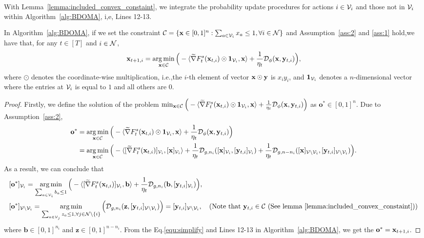 	With Lemma~\ref{lemma:included_convex_constaint}, we integrate the probability update procedures for  actions $i\in\mathcal{V}_{i}$ and those not in $\mathcal{V}_{i}$ within Algorithm~\ref{alg:BDOMA}, i,e, Lines 12-13.
		\begin{lemma}\label{lemma:simplify}
		In Algorithm~\ref{alg:BDOMA}, if we set the constraint $\mathcal{C}=\{\mathbf{x}\in[0,1]^{n}: \sum_{a\in\mathcal{V}_{i}}x_{a}\le1,\forall i\in\mathcal{N}\}$ and Assumption~\ref{ass:2} and \ref{ass:1} hold,we have that, for any $t\in[T]$ and $i\in\mathcal{N}$, 
		\begin{equation*}
			\mathbf{x}_{t+1,i}=\mathop{\arg\min}_{\mathbf{x}\in\mathcal{C}}\Big(-\langle\widetilde{\nabla} F_{t}^{s}(\mathbf{x}_{t,i})\odot\mathbf{1}_{\mathcal{V}_{i}},\mathbf{x}\rangle+\frac{1}{\eta_{t}}\mathcal{D}_{\phi}(\mathbf{x}, \mathbf{y}_{t,i})\Big), 
		\end{equation*}where $\odot$ denotes the coordinate-wise multiplication, i.e.,the $i$-th element of vector $\mathbf{x}\odot\mathbf{y}$ is $x_{i}y_{i}$, and $\mathbf{1}_{\mathcal{V}_{i}}$ denotes a $n$-dimensional vector where the entries at $\mathcal{V}_{i}$ is equal to $1$ and all others are $0$.
	\end{lemma}
	\begin{proof}
		Firstly, we define the solution of the problem $\min_{\mathbf{x}\in\mathcal{C}}\Big(-\langle\widetilde{\nabla} F_{t}^{s}(\mathbf{x}_{t,i})\odot\mathbf{1}_{\mathcal{V}_{i}},\mathbf{x}\rangle+\frac{1}{\eta_{t}}\mathcal{D}_{\phi}(\mathbf{x}, \mathbf{y}_{t,i})\Big)$ as $\textbf{o}^{*}\in[0,1]^{n}$. Due to Assumption~\ref{ass:2},
		\begin{equation*}
			\begin{aligned}
				\textbf{o}^{*}&=\mathop{\arg\min}_{\mathbf{x}\in\mathcal{C}}\Big(-\langle\widetilde{\nabla} F_{t}^{s}(\mathbf{x}_{t,i})\odot\mathbf{1}_{\mathcal{V}_{i}},\mathbf{x}\rangle+\frac{1}{\eta_{t}}\mathcal{D}_{\phi}(\mathbf{x}, \mathbf{y}_{t,i})\Big)\\
				&=\mathop{\arg\min}_{\mathbf{x}\in\mathcal{C}}\Big(-\langle[\widetilde{\nabla} F_{t}^{s}(\mathbf{x}_{t,i})]_{\mathcal{V}_{i}},[\mathbf{x}]_{\mathcal{V}_{i}}\rangle+\frac{1}{\eta_{t}}\mathcal{D}_{g,n_{i}}([\mathbf{x}]_{\mathcal{V}_{i}}, [\mathbf{y}_{t,i}]_{\mathcal{V}_{i}})+\frac{1}{\eta_{t}}\mathcal{D}_{g,n-n_{i}}([\mathbf{x}]_{\mathcal{V}\setminus\mathcal{V}_{i}}, [\mathbf{y}_{t,i}]_{\mathcal{V}\setminus\mathcal{V}_{i}})\Big).
			\end{aligned}
		\end{equation*}
As a result, we can conclude that
\begin{equation}\label{equ:simplify}
\begin{aligned}
	&[\textbf{o}^{*}]_{\V_{i}}=\mathop{\arg\min}_{\sum_{a\in\V_{i}}b_{a}\le1}\Big(-\langle[\widetilde{\nabla} F_{t}^{s}(\x_{t,i})]_{\V_{i}},\textbf{b}\rangle+\frac{1}{\eta_{t}}\mathcal{D}_{g,n_{i}}(\textbf{b}, [\y_{t,i}]_{\V_{i}})\Big),\\
&[\textbf{o}^{*}]_{\V\setminus\V_{i}}=\mathop{\arg\min}_{\sum_{a\in\V_{j}}z_{a}\le1, \forall j\in\N\setminus\{i\}}\Big(\mathcal{D}_{g,n_{i}}(\textbf{z}, [\y_{t,i}]_{\V\setminus\V_{i}})\Big)=[\y_{t,i}]_{\V\setminus\V_{i}}, \ \  \ (\text{Note that}\ \y_{t,i}\in\C\text{\ (See lemma~\ref{lemma:included_convex_constaint})})
\end{aligned}
\end{equation} where  $\textbf{b}\in[0,1]^{n_{i}}$ and $\textbf{z}\in[0,1]^{n-n_{i}}$.
From the Eq.\eqref{equ:simplify} and Lines 12-13 in Algorithm~\ref{alg:BDOMA}, we get the $\textbf{o}^{*}=\mathbf{x}_{t+1,i}$.
	\end{proof}
